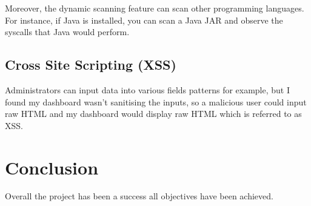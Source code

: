 Moreover, the dynamic scanning feature can scan other programming languages.
For instance, if Java is installed, you can scan a Java JAR
and observe the syscalls that Java would perform.

\subsection{Cross Site Scripting (XSS)}
Administrators can input data into various fields patterns for example,
but I found my dashboard wasn't sanitising the inputs,
so a malicious user could input raw HTML and my dashboard would
display raw HTML which is referred to as XSS.

\section{Conclusion}
Overall the project has been a success all objectives have been achieved.